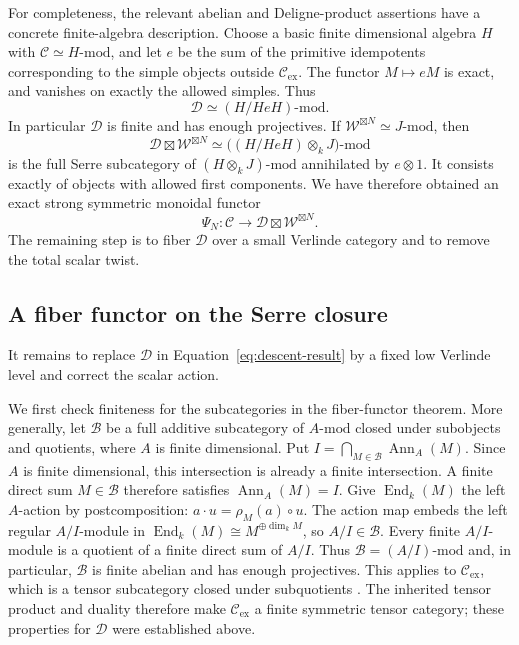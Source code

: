 For completeness, the relevant abelian and Deligne-product assertions
have a concrete finite-algebra description.  Choose a basic finite
dimensional algebra \(H\) with \(\mathcal C\simeq H\text{-}\mathrm{mod}\),
and let \(e\) be the sum of the primitive idempotents corresponding to the
simple objects outside \(\mathcal C_{\mathrm{ex}}\).  The functor
\(M\mapsto eM\) is exact, and vanishes on exactly the allowed simples.
Thus
\[
 \mathcal D\simeq(H/HeH)\text{-}\mathrm{mod}.
\]
In particular \(\mathcal D\) is finite and has enough projectives.  If
\(\mathcal W^{\boxtimes N}\simeq J\text{-}\mathrm{mod}\), then
\[
 \mathcal D\boxtimes\mathcal W^{\boxtimes N}
 \simeq\bigl((H/HeH)\otimes_kJ\bigr)\text{-}\mathrm{mod}
\]
is the full Serre subcategory of
\((H\otimes_kJ)\text{-}\mathrm{mod}\) annihilated by \(e\otimes1\).
It consists exactly of objects with allowed first components.
We have therefore obtained an exact strong symmetric monoidal functor
\begin{equation}\label{eq:descent-result}
 \Psi_N:\mathcal C\longrightarrow
 \mathcal D\boxtimes\mathcal W^{\boxtimes N}.
\end{equation}
The remaining step is to fiber \(\mathcal D\) over a small Verlinde
category and to remove the total scalar twist.

\subsection{A fiber functor on the Serre closure}
\label{subsec:serre-fiber}
It remains to replace $\mathcal D$ in Equation~\eqref{eq:descent-result}
by a fixed low Verlinde level and correct the scalar action.

We first check finiteness for the subcategories in the fiber-functor
theorem.  More generally, let $\mathcal B$ be a full additive
subcategory of $A\text{-}\mathrm{mod}$ closed under subobjects and
quotients, where $A$ is finite dimensional.  Put
$I=\bigcap_{M\in\mathcal B}\operatorname{Ann}_A(M)$.
Since $A$ is finite dimensional, this intersection is already a finite
intersection.  A finite direct sum $M\in\mathcal B$ therefore satisfies
$\operatorname{Ann}_A(M)=I$.
Give $\operatorname{End}_k(M)$ the left $A$-action by postcomposition:
$a\cdot u=\rho_M(a)\circ u$.  The action map embeds the left regular
$A/I$-module in $\operatorname{End}_k(M)\cong M^{\oplus\dim_k M}$,
so $A/I\in\mathcal B$.
Every finite $A/I$-module is a quotient of a finite direct sum of
$A/I$.  Thus $\mathcal B=(A/I)\text{-}\mathrm{mod}$ and, in particular,
$\mathcal B$ is finite abelian and has enough projectives.
This applies to $\mathcal C_{\mathrm{ex}}$, which is a tensor
subcategory closed under subquotients
\cite[Proposition~7.4]{EtingofOstrikFrobenius}.
The inherited tensor product and duality therefore make
$\mathcal C_{\mathrm{ex}}$ a finite symmetric tensor category; these
properties for $\mathcal D$ were established above.

